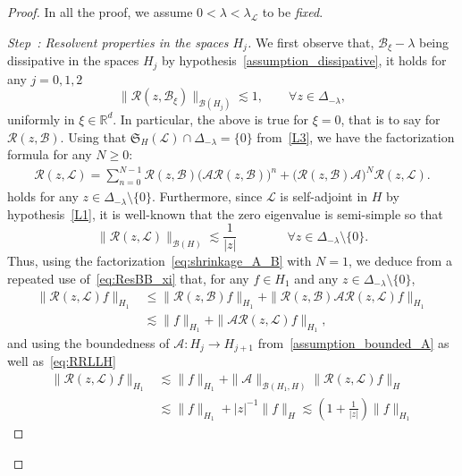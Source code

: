 \documentclass[10pt]{amsart}
\theoremstyle{definition}\newtheorem{defi}[theo]{Definition}\newtheorem{rema}[theo]{Remark}\newtheorem{exam}[theo]{Example}\newtheorem{exem}[theo]{Example}\newtheorem{nota}[theo]{Notation}
\newcommand{\R}{\mathbb{R}}
\newcommand{\fkS}{\mathfrak{S}}
\renewcommand{\AA}{\mathcal{A}}
\newcommand{\BB}{\mathcal{B}}
\newcommand{\LL}{\mathcal{L}}
\newcommand{\RR}{\mathcal{R}}
\newcommand{\BBB}{\mathscr{B}}
\newcommand{\Ss}{H}
\renewcommand*\ge{\geqslant}
\renewcommand*\leq{\leqslant}
\newcounter{stepcount}
\newenvironment{step}[1]{\refstepcounter{stepcount}\begin{proof}[Step~\thestepcount: #1]}{\let\qed\relax\end{proof}}
\let\oldforall\forall
\renewcommand*{\forall}{\mathrel{\oldforall}}
\begin{document}
\begin{proof}
In all the proof, we assume $0 < \lambda < \lambda_\LL$ to be \emph{fixed}.

\begin{step}{{Resolvent properties in the spaces $\Ss_j$}}
We first observe that, $\BB_{\xi} - \lambda$ being dissipative in the spaces $\Ss_j$ by hypothesis~\eqref{assumption_dissipative}, it holds for any $j = 0, 1, 2$
\begin{equation}\label{eq:ResBB_xi}
\|\RR(z,\BB_{\xi})\|_{\BBB(\Ss_{j})} \lesssim 1, \qquad \forall z \in \Delta_{-\lambda},
\end{equation}
uniformly in $\xi \in \R^{d}$. In particular, the above is true for $\xi=0$, that is to say for $\RR(z,\BB)$. Using that $\fkS_{\Ss}\left(\LL\right) \cap \Delta_{-\lambda} = \{0\}$ from~\eqref{L3}, we have the factorization formula for any $N \ge 0$:
\begin{gather}\label{eq:shrinkage_A_B}
\RR(z,\LL) = \sum_{n = 0}^{N-1} \RR(z,\BB) \Big(\AA \RR(z,\BB) \Big)^n + \Big(\RR(z,\BB) \AA \Big)^N \RR(z,\LL).
\end{gather}
holds for any $z \in \Delta_{-\lambda} \setminus\{0\}.$ Furthermore, since $\LL$ is self-adjoint in $\Ss$ by hypothesis~\eqref{L1}, it is well-known that the zero eigenvalue is semi-simple so that
\begin{equation}\label{eq:RRLLH}
\|\RR(z,\LL)\|_{\BBB(\Ss)} \lesssim \frac{1}{|z|} \qquad \qquad
\forall z \in \Delta_{-\lambda}\setminus\{0\}.
\end{equation}
Thus, using the factorization~\eqref{eq:shrinkage_A_B} with $N=1$, we deduce from a repeated use of~\eqref{eq:ResBB_xi} that, for any $f \in \Ss_{1}$ and any $z \in \Delta_{-\lambda}\setminus\{0\}$,
\begin{align*}
\|\RR(z,\LL)f\|_{\Ss_{1}} &\leq \|\RR(z,\BB)f\|_{\Ss_{1}} + \|\RR(z,\BB)\AA\RR(z,\LL)f\|_{\Ss_{1}}
\\
&\lesssim \|f\|_{\Ss_{1}} +\|\AA\RR(z,\LL)f\|_{\Ss_{1}},
\end{align*}
and using the boundedness of $\AA : \Ss_j \to \Ss_{j+1}$ from~\eqref{assumption_bounded_A} as well as~\eqref{eq:RRLLH}
\begin{align*}
\|\RR(z,\LL)f\|_{\Ss_{1}} & \lesssim \|f\|_{\Ss_{1}} + \|\AA\|_{\BBB(\Ss_{1},\Ss)}\|\RR(z,\LL)f\|_{\Ss}\\
&\lesssim \|f\|_{\Ss_{1}}+ |z|^{-1}\|f\|_{\Ss} \lesssim \left(1+\frac{1}{|z|}\right)\|f\|_{\Ss_{1}}
\end{align*}

\end{step}
\end{proof}
\end{document}
